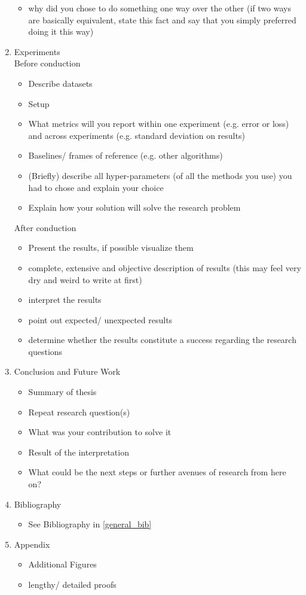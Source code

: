 \documentclass[twocolumn]{mlai-guide}
\begin{document}
\begin{enumerate}
\begin{itemize}
			\item why did you chose to do something one way over the other (if two ways are basically equivalent, state this fact and say that you simply preferred doing it this way)
		\end{itemize}
	\item Experiments\\
		Before conduction
		\begin{itemize}
			\item Describe datasets
			\item Setup
			\item What metrics will you report within one experiment (e.g. error or loss) and across experiments (e.g. standard deviation on results)
			\item Baselines/ frames of reference (e.g. other algorithms)
			\item (Briefly) describe all hyper-parameters (of all the methods you use) you had to chose and explain your choice
			\item Explain how your solution will solve the research problem
		\end{itemize} 
		After conduction
		\begin{itemize}
			\item Present the results, if possible visualize them
			\item complete, extensive and objective description of results (this may feel very dry and weird to write at first)
			\item interpret the results
			\item point out expected/ unexpected results
			\item determine whether the results constitute a success regarding the research questions
		\end{itemize}
	\item Conclusion and Future Work
		\begin{itemize}
			\item Summary of thesis
			\item Repeat research question(s)
			\item What was your contribution to solve it
			\item Result of the interpretation
			\item What could be the next steps or further avenues of research from here on?
		\end{itemize}
	\item Bibliography
		\begin{itemize}
			\item See Bibliography in \ref{general_bib}
		\end{itemize}
	\item Appendix
		\begin{itemize}
			\item Additional Figures
			\item lengthy/ detailed proofs
		\end{itemize}
\end{enumerate}
\end{document}

